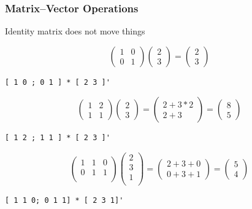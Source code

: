 \documentclass[11pt]{beamer}
\begin{document}
\begin{frame}[fragile]
  \frametitle{Matrix--Vector Operations}
  \Enlarge

  \begin{enumerate}
  \myitem  Identity matrix does not move things
  \end{enumerate}
  $$
\left( \begin{array}{cc}
  1 & 0 \\
  0 & 1
\end{array} \right)
\left( \begin{array}{c}
  2 \\
  3
\end{array} \right)
=
\left( \begin{array}{c}
  2 \\
  3
\end{array} \right)
  $$
  \begin{Verbatim}
[ 1 0 ; 0 1 ] * [ 2 3 ]'
  \end{Verbatim}
  \pause
  \vspace{2mm}
  $$
\left( \begin{array}{cc}
  1 & 2 \\
  1 & 1
\end{array} \right)
\left( \begin{array}{c}
  2 \\
  3
\end{array} \right)
=
\left( \begin{array}{c}
  2+3*2 \\
  2+3
\end{array} \right)
=
\left( \begin{array}{c}
  8 \\
  5
\end{array} \right)
  $$
  \begin{Verbatim}
[ 1 2 ; 1 1 ] * [ 2 3 ]'
  \end{Verbatim}
  \vspace{2mm}
  \pause
  $$
\left( \begin{array}{ccc}
  1 & 1 & 0\\
  0 & 1 & 1\\
\end{array} \right)
\left( \begin{array}{c}
  2 \\
  3 \\
  1 \\
\end{array} \right)
=
\left( \begin{array}{c}
  2+3+0\\
  0+3+1
\end{array} \right)
=
\left( \begin{array}{c}
  5 \\
  4
\end{array} \right)
  $$
  \begin{Verbatim}
[ 1 1 0; 0 1 1] * [ 2 3 1]'
  \end{Verbatim}
\end{frame}
\end{document}
